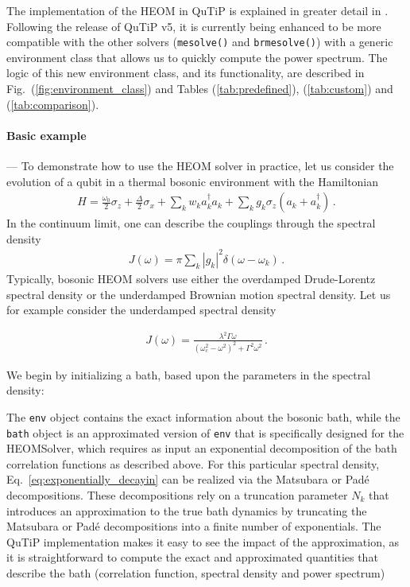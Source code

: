 \documentclass[preprint,3p,sort&compress]{elsarticle}
\def\code#1{\texttt{#1}}
\begin{document}
The implementation of the HEOM in QuTiP is explained in greater detail in \cite{lambert2020bofinheom}. Following the release of QuTiP v5, it is currently being enhanced to be more compatible with the other solvers (\code{mesolve()} and \code{brmesolve()}) with a generic environment class that allows us to quickly compute the power spectrum. The logic of this new environment class, and its functionality, are described in Fig.~(\ref{fig:environment_class}) and Tables (\ref{tab:predefined}), (\ref{tab:custom}) and (\ref{tab:comparison}).

\paragraph{Basic example} --- To demonstrate how to use the HEOM solver in practice, let us consider the evolution of a qubit in a thermal bosonic environment with the Hamiltonian
%
\begin{align}
     H = \frac{\omega_{0}}{2} \sigma_{z} + \frac{\Delta}{2} \sigma_{x} + \sum_{k} w_{k} a_{k}^{\dagger} a_{k} + \sum_{k} g_{k} \sigma_{z} (a_{k}+a_{k}^{\dagger}) \, . \label{Hheom}
\end{align}
%
In the continuum limit, one can describe the couplings through the spectral density 
\begin{align}
    J(\omega) = \pi \sum_{k} |g_{k}|^{2} \delta(\omega-\omega_{k}) \,.
\end{align}
Typically, bosonic HEOM solvers use either the overdamped Drude-Lorentz spectral density or the underdamped Brownian motion spectral density. Let us for example consider the underdamped spectral density

\begin{align}
 J(\omega) = \frac{\lambda^{2} \Gamma \omega}{(\omega_{c}^{2}-
\omega^{2})^{2}+ \Gamma^{2} \omega^{2}} \, .
\end{align}

We begin by initializing a bath, based upon the parameters in the spectral density:

%
The \code{env} object contains the exact information about the bosonic bath, while the \code{bath} object is an approximated version of \code{env} that is specifically designed for the HEOMSolver, which requires as input an exponential decomposition of the bath correlation functions as described above. For this particular spectral density, Eq.\ \ref{eq:exponentially_decayin} can be realized via the Matsubara or Pad\'{e} decompositions. These decompositions rely on a truncation parameter $N_k$ that introduces an approximation to the true bath dynamics by truncating the Matsubara or Pad\'{e} decompositions into a finite number of exponentials. The QuTiP implementation makes it easy to see the impact of the approximation, as it is straightforward to compute the exact and approximated quantities that describe the bath (correlation function, spectral density and power spectrum)
\end{document}
